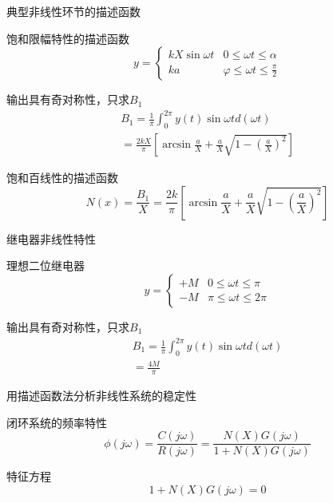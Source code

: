 \begin{frame}{典型非线性环节的描述函数}
\begin{block}{饱和限幅特性的描述函数}
\begin{equation*}
y=\begin{cases}
kX\sin \omega t & 0\leq\omega t\leq \alpha\\
ka & \varphi\leq\omega t\leq \frac{\pi}{2}
\end{cases}
\end{equation*}
\end{block}
\begin{block}{输出具有奇对称性，只求$B_1$}
\begin{eqnarray*}
B_1=\frac{1}{\pi}\int_{0}^{2\pi}y(t)\sin \omega td(\omega t)\\
=\frac{2kX}{\pi}\left[\arcsin\frac{a}{X}+\frac{a}{X}\sqrt{1-(\frac{a}{X})^2}\right]
\end{eqnarray*}
\end{block}
\end{frame}

\begin{frame}
\begin{block}{饱和百线性的描述函数}
\begin{equation*}
N(x)=\frac{B_1}{X}=\frac{2k}{\pi}\left[\arcsin\frac{a}{X}+\frac{a}{X}\sqrt{1-(\frac{a}{X})^2}\right]
\end{equation*}
\end{block}
\end{frame}

\begin{frame}{继电器非线性特性}
\begin{block}{理想二位继电器}
\begin{equation*}
y=\begin{cases}
+M & 0\leq\omega t\leq \pi\\
-M & \pi\leq\omega t\leq 2\pi
\end{cases}
\end{equation*}
\end{block}
\begin{block}{输出具有奇对称性，只求$B_1$}
\begin{eqnarray*}
B_1=\frac{1}{\pi}\int_{0}^{2\pi}y(t)\sin \omega td(\omega t)\\
=\frac{4M}{\pi}
\end{eqnarray*}
\end{block}
\end{frame}

\begin{frame}{用描述函数法分析非线性系统的稳定性}
\begin{block}{闭环系统的频率特性}
\begin{equation*}
\phi(j\omega)=\frac{C(j\omega)}{R(j\omega)}=\frac{N(X)G(j\omega)}{1+N(X)G(j\omega)}
\end{equation*}
\end{block}
\begin{block}{特征方程}
\begin{equation*}
1+N(X)G(j\omega)=0
\end{equation*} 
\end{block}
\end{frame}

